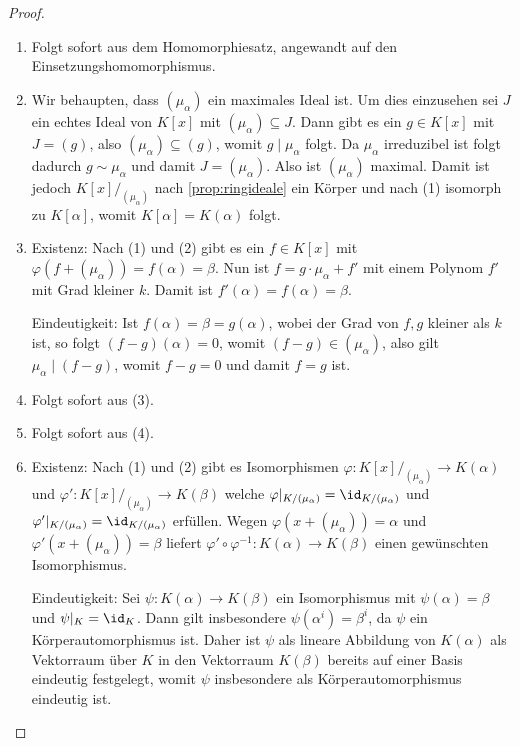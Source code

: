 \begin{proof}{\ }
    \begin{enumerate}
        \item Folgt sofort aus dem Homomorphiesatz, angewandt auf den Einsetzungshomomorphismus.
        
        \item Wir behaupten, dass $(\mu_\alpha)$ ein maximales Ideal ist. Um dies einzusehen sei $J$ ein echtes Ideal von $K[x]$ mit $(\mu_\alpha) \subseteq J$. Dann gibt es ein $g \in K[x]$ mit $J = (g)$, also $(\mu_\alpha) \subseteq (g)$, womit $g \mid \mu_\alpha$ folgt. Da $\mu_\alpha$ irreduzibel ist folgt dadurch $g \sim \mu_\alpha$ und damit $J = (\mu_\alpha)$. Also ist $(\mu_\alpha)$ maximal. Damit ist jedoch $K[x]/_{(\mu_\alpha)}$ nach \cref{prop:ringideale} ein Körper und nach (1) isomorph zu $K[\alpha]$, womit $K[\alpha] = K(\alpha)$ folgt.
        
        \item Existenz: Nach (1) und (2) gibt es ein $f \in K[x]$ mit $\varphi(f + (\mu_\alpha)) = f(\alpha) = \beta$. Nun ist $f = g \cdot \mu_\alpha + f'$ mit einem Polynom $f'$ mit Grad kleiner $k$. Damit ist $f'(\alpha) = f(\alpha) = \beta$.
        
        Eindeutigkeit: Ist $f(\alpha) = \beta = g(\alpha)$, wobei der Grad von $f, g$ kleiner als $k$ ist, so folgt $(f-g)(\alpha) = 0$, womit $(f-g) \in (\mu_\alpha)$, also gilt $\mu_\alpha \mid (f-g)$, womit $f-g=0$ und damit $f=g$ ist.

        \item Folgt sofort aus (3).
        
        \item Folgt sofort aus (4).
        
        \item {Existenz:} Nach (1) und (2) gibt es Isomorphismen
        $\varphi:K[x]/_{(\mu_\alpha)}\to K(\alpha)$ und $\varphi':K[x]/_{(\mu_\alpha)}\to K(\beta)$
        welche $\varphi\vert_{K/(\mu_\alpha)}=\id_{K/(\mu_\alpha)}$ und $\varphi'\vert_{K/(\mu_\alpha)}=\id_{K/(\mu_\alpha)}$ erfüllen. Wegen $\varphi(x+(\mu_\alpha))=\alpha$
        und $\varphi'(x+(\mu_\alpha))=\beta$ liefert $\varphi'\circ\varphi^{-1}:K(\alpha)\to K(\beta)$
        einen gewünschten Isomorphismus.

        {Eindeutigkeit:} Sei $\psi:K(\alpha)\to K(\beta)$ ein Isomorphismus mit $\psi(\alpha)=\beta$
        und $\psi\vert_K=\id_K$. Dann gilt insbesondere $\psi(\alpha^i)=\beta^i$, da $\psi$ ein Körperautomorphismus
        ist. Daher ist $\psi$ als lineare Abbildung von $K(\alpha)$ als Vektorraum über $K$ in den Vektorraum $K(\beta)$
        bereits auf einer Basis eindeutig festgelegt, womit $\psi$ insbesondere als Körperautomorphismus eindeutig ist.
    \end{enumerate}
\end{proof}

